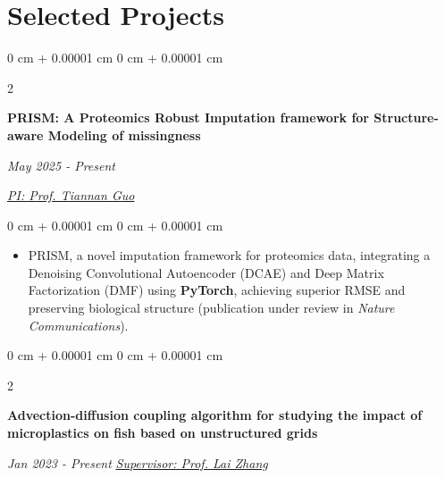 \documentclass[10pt, letterpaper]{article}
\newenvironment{highlights}{
    \begin{itemize}[
        topsep=0.10 cm,
        parsep=0.10 cm,
        partopsep=0pt,
        itemsep=0pt,
        leftmargin=0 cm + 10pt
    ]
}{
    \end{itemize}
} %
\newenvironment{onecolentry}{
    \begin{adjustwidth}{
        0 cm + 0.00001 cm
    }{
        0 cm + 0.00001 cm
    }
}{
    \end{adjustwidth}
} %
\newenvironment{twocolentry}[2][]{
    \onecolentry
    \def\secondColumn{#2}
    \setcolumnwidth{\fill, 4.5 cm}
    \begin{paracol}{2}
}{
    \switchcolumn \raggedleft \secondColumn
    \end{paracol}
    \endonecolentry
} %
\begin{document}







        \vspace{0.1 cm}


    
    \vspace{0.1 cm}
    
    \section{Selected Projects}





    
        \begin{twocolentry}{
            \textit{May 2025 - Present}
            
            \href{https://en.westlake.edu.cn/faculty/tiannan-guo.html}{\textit{PI: Prof. Tiannan Guo}}
        }
            \textbf{PRISM: A Proteomics Robust Imputation framework for Structure-aware Modeling of missingness}
        
        \end{twocolentry}

        \vspace{0.20 cm}
        \begin{onecolentry}
            \begin{highlights}
                \item  PRISM, a novel imputation framework for proteomics data, integrating a Denoising Convolutional Autoencoder (DCAE) and Deep Matrix Factorization (DMF) using \textbf{PyTorch}, achieving superior RMSE and preserving biological structure (publication under review in \textit{Nature Communications}).
            \end{highlights}
        \end{onecolentry}

  

        \vspace{0.3 cm}


    
        \begin{twocolentry}{
            \textit{Jan 2023 - Present}
            \href{https://scholar.google.com/citations?user=QkcU09oAAAAJ&hl=en}{\textit{Supervisor: Prof. Lai Zhang}}
        }
            \textbf{Advection-diffusion coupling algorithm for studying the impact of microplastics on fish based on unstructured grids}
        
        \end{twocolentry}
\end{document}
